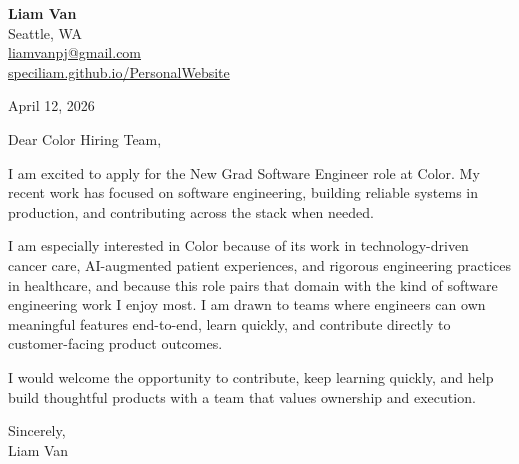 \documentclass[letterpaper,11pt]{article}
\begin{document}
\begin{flushleft}
\textbf{\Large Liam Van} \\
Seattle, WA \\
\href{mailto:liamvanpj@gmail.com}{liamvanpj@gmail.com} \\
\href{https://speciliam.github.io/PersonalWebsite}{speciliam.github.io/PersonalWebsite}
\end{flushleft}

April 12, 2026

\noindent Dear Color Hiring Team,

\noindent I am excited to apply for the New Grad Software Engineer role at Color. My recent work has focused on software engineering, building reliable systems in production, and contributing across the stack when needed.

\noindent I am especially interested in Color because of its work in technology-driven cancer care, AI-augmented patient experiences, and rigorous engineering practices in healthcare, and because this role pairs that domain with the kind of software engineering work I enjoy most. I am drawn to teams where engineers can own meaningful features end-to-end, learn quickly, and contribute directly to customer-facing product outcomes.

\noindent I would welcome the opportunity to contribute, keep learning quickly, and help build thoughtful products with a team that values ownership and execution.

\noindent Sincerely, \\
Liam Van
\end{document}
